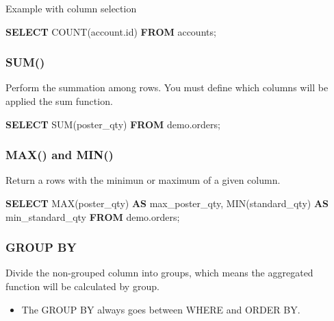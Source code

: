 \documentclass[]{book}
\newenvironment{Shaded}{\begin{snugshade}}{\end{snugshade}}
\newcommand{\KeywordTok}[1]{\textcolor[rgb]{0.13,0.29,0.53}{\textbf{#1}}}
\newcommand{\FunctionTok}[1]{\textcolor[rgb]{0.00,0.00,0.00}{#1}}
\newcommand{\NormalTok}[1]{#1}
\providecommand{\tightlist}{%
  \setlength{\itemsep}{0pt}\setlength{\parskip}{0pt}}
\begin{document}
Example with column selection

\begin{Shaded}
\begin{Highlighting}[]
\KeywordTok{SELECT} \FunctionTok{COUNT}\NormalTok{(account.id)}
\KeywordTok{FROM}\NormalTok{ accounts;}
\end{Highlighting}
\end{Shaded}

\subsubsection{SUM()}\label{sum}

Perform the summation among rows. You must define which columns will be
applied the sum function.

\begin{Shaded}
\begin{Highlighting}[]
\KeywordTok{SELECT} \FunctionTok{SUM}\NormalTok{(poster_qty)}
\KeywordTok{FROM}\NormalTok{ demo.orders;}
\end{Highlighting}
\end{Shaded}

\subsubsection{MAX() and MIN()}\label{max-and-min}

Return a rows with the minimun or maximum of a given column.

\begin{Shaded}
\begin{Highlighting}[]
\KeywordTok{SELECT} \FunctionTok{MAX}\NormalTok{(poster_qty) }\KeywordTok{AS}\NormalTok{ max_poster_qty,}
       \FunctionTok{MIN}\NormalTok{(standard_qty) }\KeywordTok{AS}\NormalTok{ min_standard_qty}
\KeywordTok{FROM}\NormalTok{ demo.orders;}
\end{Highlighting}
\end{Shaded}

\subsubsection{GROUP BY}\label{group-by}

Divide the non-grouped column into groups, which means the aggregated
function will be calculated by group.

\begin{itemize}
\tightlist
\item
  The GROUP BY always goes between WHERE and ORDER BY.
\end{itemize}
\end{document}
